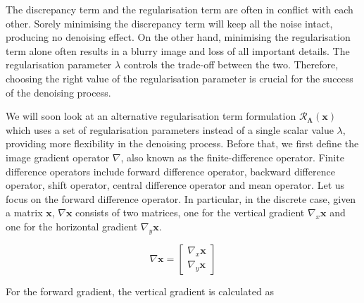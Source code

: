 \documentclass[12pt]{article}
\begin{document}
The discrepancy term and the regularisation term are often in conflict with each other. Sorely minimising the discrepancy term will keep all the noise intact, producing no denoising effect. On the other hand, minimising the regularisation term alone often results in a blurry image and loss of all important details. The regularisation parameter $\lambda$ controls the trade-off between the two. Therefore, choosing the right value of the regularisation parameter is crucial for the success of the denoising process.

We will soon look at an alternative regularisation term formulation $\mathcal{R}_{\mathbf{\Lambda}}(\mathbf{x})$ which uses a set of regularisation parameters instead of a single scalar value $\lambda$, providing more flexibility in the denoising process. Before that, we first define the image gradient operator $\nabla$, also known as the finite-difference operator.
Finite difference operators include forward difference operator,
backward difference operator, shift operator, central difference operator and mean operator.
Let us focus on the forward difference operator. In particular, in the discrete case, given a matrix $\mathbf{x}$, $\nabla \mathbf{x}$ consists of two matrices, one for the vertical gradient $\nabla_{x} \mathbf{x}$ and one for the horizontal gradient $\nabla_{y} \mathbf{x}$.


\begin{equation}
  \nabla \mathbf{x} = \begin{bmatrix}
    \nabla_{x} \mathbf{x} \\
    \nabla_{y} \mathbf{x}
  \end{bmatrix}
\end{equation}



For the forward gradient, the vertical gradient is calculated as
\end{document}
